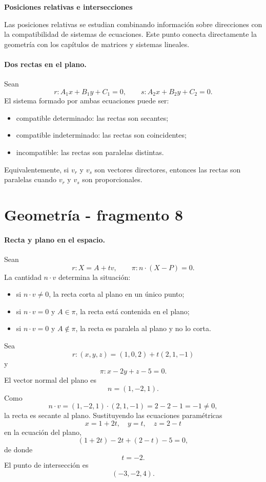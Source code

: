 \textbf{Posiciones relativas e intersecciones}

Las posiciones relativas se estudian combinando información sobre direcciones con la compatibilidad de sistemas de ecuaciones. Este punto conecta directamente la geometría con los capítulos de matrices y sistemas lineales.

\paragraph{Dos rectas en el plano.}
Sean
\[
r:A_1x+B_1y+C_1=0,
\qquad
s:A_2x+B_2y+C_2=0.
\]
El sistema formado por ambas ecuaciones puede ser:
\begin{itemize}
\item compatible determinado: las rectas son secantes;
\item compatible indeterminado: las rectas son coincidentes;
\item incompatible: las rectas son paralelas distintas.
\end{itemize}

Equivalentemente, si $v_r$ y $v_s$ son vectores directores, entonces las rectas son paralelas cuando $v_r$ y $v_s$ son proporcionales.


\section{Geometría - fragmento 8}
\paragraph{Recta y plano en el espacio.}
Sean
\[
r:X=A+tv,
\qquad
\pi:n\cdot(X-P)=0.
\]
La cantidad $n\cdot v$ determina la situación:
\begin{itemize}
\item si $n\cdot v\neq0$, la recta corta al plano en un único punto;
\item si $n\cdot v=0$ y $A\in\pi$, la recta está contenida en el plano;
\item si $n\cdot v=0$ y $A\notin\pi$, la recta es paralela al plano y no lo corta.
\end{itemize}

\begin{example}
Sea
\[
r:(x,y,z)=(1,0,2)+t(2,1,-1)
\]
y
\[
\pi: x-2y+z-5=0.
\]
El vector normal del plano es
\[
n=(1,-2,1).
\]
Como
\[
n\cdot v=(1,-2,1)\cdot(2,1,-1)=2-2-1=-1\neq0,
\]
la recta es secante al plano. Sustituyendo las ecuaciones paramétricas
\[
x=1+2t,\quad y=t,\quad z=2-t
\]
en la ecuación del plano,
\[
(1+2t)-2t+(2-t)-5=0,
\]
de donde
\[
t=-2.
\]
El punto de intersección es
\[
\boxed{(-3,-2,4).}
\]
\end{example}

